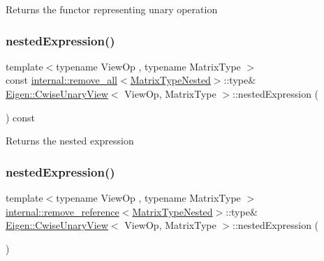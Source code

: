\begin{DoxyReturn}{Returns}
the functor representing unary operation 
\end{DoxyReturn}
\mbox{\label{class_eigen_1_1_cwise_unary_view_a21d59e387e600b1d650cb002175760b4}} 
\subsubsection{\texorpdfstring{nestedExpression()}{nestedExpression()}\hspace{0.1cm}{\footnotesize\ttfamily [1/2]}}
{\footnotesize\ttfamily template$<$typename View\+Op , typename Matrix\+Type $>$ \\
const \mbox{\hyperlink{struct_eigen_1_1internal_1_1remove__all}{internal\+::remove\+\_\+all}}$<$\mbox{\hyperlink{struct_eigen_1_1internal_1_1true__type}{Matrix\+Type\+Nested}}$>$\+::type\& \mbox{\hyperlink{class_eigen_1_1_cwise_unary_view}{Eigen\+::\+Cwise\+Unary\+View}}$<$ View\+Op, Matrix\+Type $>$\+::nested\+Expression (\begin{DoxyParamCaption}{ }\end{DoxyParamCaption}) const\hspace{0.3cm}{\ttfamily [inline]}}

\begin{DoxyReturn}{Returns}
the nested expression 
\end{DoxyReturn}
\mbox{\label{class_eigen_1_1_cwise_unary_view_add6689b53e595e968e89592ea30b6800}} 
\subsubsection{\texorpdfstring{nestedExpression()}{nestedExpression()}\hspace{0.1cm}{\footnotesize\ttfamily [2/2]}}
{\footnotesize\ttfamily template$<$typename View\+Op , typename Matrix\+Type $>$ \\
\mbox{\hyperlink{struct_eigen_1_1internal_1_1remove__reference}{internal\+::remove\+\_\+reference}}$<$\mbox{\hyperlink{struct_eigen_1_1internal_1_1true__type}{Matrix\+Type\+Nested}}$>$\+::type\& \mbox{\hyperlink{class_eigen_1_1_cwise_unary_view}{Eigen\+::\+Cwise\+Unary\+View}}$<$ View\+Op, Matrix\+Type $>$\+::nested\+Expression (\begin{DoxyParamCaption}{ }\end{DoxyParamCaption})\hspace{0.3cm}{\ttfamily [inline]}}

